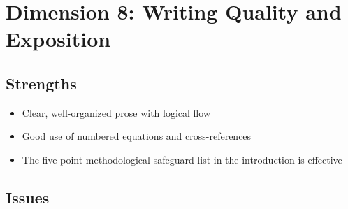 \documentclass[12pt,a4paper]{article}
\begin{document}
\section{Dimension 8: Writing Quality and Exposition}
\label{sec:d8}

\subsection*{Strengths}
\begin{itemize}
    \item Clear, well-organized prose with logical flow
    \item Good use of numbered equations and cross-references
    \item The five-point methodological safeguard list in the introduction is effective
\end{itemize}

\subsection*{Issues}
\end{document}
